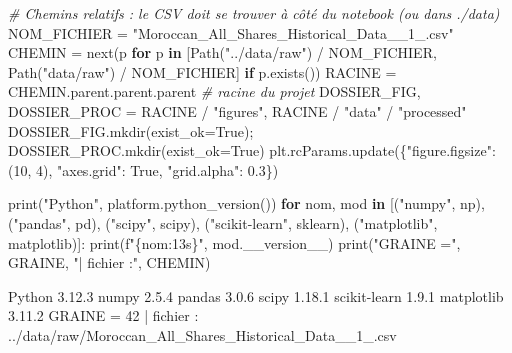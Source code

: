 \documentclass[
  10pt,
]{article}
\newenvironment{Shaded}{}{}
\newcommand{\BuiltInTok}[1]{\textcolor[rgb]{0.00,0.50,0.00}{#1}}
\newcommand{\CommentTok}[1]{\textcolor[rgb]{0.38,0.63,0.69}{\textit{#1}}}
\newcommand{\ControlFlowTok}[1]{\textcolor[rgb]{0.00,0.44,0.13}{\textbf{#1}}}
\newcommand{\DecValTok}[1]{\textcolor[rgb]{0.25,0.63,0.44}{#1}}
\newcommand{\FloatTok}[1]{\textcolor[rgb]{0.25,0.63,0.44}{#1}}
\newcommand{\KeywordTok}[1]{\textcolor[rgb]{0.00,0.44,0.13}{\textbf{#1}}}
\newcommand{\NormalTok}[1]{#1}
\newcommand{\OperatorTok}[1]{\textcolor[rgb]{0.40,0.40,0.40}{#1}}
\newcommand{\SpecialCharTok}[1]{\textcolor[rgb]{0.25,0.44,0.63}{#1}}
\newcommand{\SpecialStringTok}[1]{\textcolor[rgb]{0.73,0.40,0.53}{#1}}
\newcommand{\StringTok}[1]{\textcolor[rgb]{0.25,0.44,0.63}{#1}}
\newcommand{\VariableTok}[1]{\textcolor[rgb]{0.10,0.09,0.49}{#1}}
\begin{document}
\begin{Shaded}
\begin{Highlighting}[]
\CommentTok{\# Chemins relatifs : le CSV doit se trouver à côté du notebook (ou dans ./data)}
\NormalTok{NOM\_FICHIER }\OperatorTok{=} \StringTok{"Moroccan\_All\_Shares\_Historical\_Data\_\_1\_.csv"}
\NormalTok{CHEMIN }\OperatorTok{=} \BuiltInTok{next}\NormalTok{(p }\ControlFlowTok{for}\NormalTok{ p }\KeywordTok{in}\NormalTok{ [Path(}\StringTok{"../data/raw"}\NormalTok{) }\OperatorTok{/}\NormalTok{ NOM\_FICHIER, Path(}\StringTok{"data/raw"}\NormalTok{) }\OperatorTok{/}\NormalTok{ NOM\_FICHIER] }\ControlFlowTok{if}\NormalTok{ p.exists())}
\NormalTok{RACINE }\OperatorTok{=}\NormalTok{ CHEMIN.parent.parent.parent                  }\CommentTok{\# racine du projet}
\NormalTok{DOSSIER\_FIG, DOSSIER\_PROC }\OperatorTok{=}\NormalTok{ RACINE }\OperatorTok{/} \StringTok{"figures"}\NormalTok{, RACINE }\OperatorTok{/} \StringTok{"data"} \OperatorTok{/} \StringTok{"processed"}
\NormalTok{DOSSIER\_FIG.mkdir(exist\_ok}\OperatorTok{=}\VariableTok{True}\NormalTok{)}\OperatorTok{;}\NormalTok{ DOSSIER\_PROC.mkdir(exist\_ok}\OperatorTok{=}\VariableTok{True}\NormalTok{)}
\NormalTok{plt.rcParams.update(\{}\StringTok{"figure.figsize"}\NormalTok{: (}\DecValTok{10}\NormalTok{, }\DecValTok{4}\NormalTok{), }\StringTok{"axes.grid"}\NormalTok{: }\VariableTok{True}\NormalTok{, }\StringTok{"grid.alpha"}\NormalTok{: }\FloatTok{0.3}\NormalTok{\})}

\BuiltInTok{print}\NormalTok{(}\StringTok{"Python"}\NormalTok{, platform.python\_version())}
\ControlFlowTok{for}\NormalTok{ nom, mod }\KeywordTok{in}\NormalTok{ [(}\StringTok{"numpy"}\NormalTok{, np), (}\StringTok{"pandas"}\NormalTok{, pd), (}\StringTok{"scipy"}\NormalTok{, scipy), (}\StringTok{"scikit{-}learn"}\NormalTok{, sklearn), (}\StringTok{"matplotlib"}\NormalTok{, matplotlib)]:}
    \BuiltInTok{print}\NormalTok{(}\SpecialStringTok{f"}\SpecialCharTok{\{}\NormalTok{nom}\SpecialCharTok{:13s\}}\SpecialStringTok{"}\NormalTok{, mod.\_\_version\_\_)}
\BuiltInTok{print}\NormalTok{(}\StringTok{"GRAINE ="}\NormalTok{, GRAINE, }\StringTok{"| fichier :"}\NormalTok{, CHEMIN)}
\end{Highlighting}
\end{Shaded}

\begin{Shaded}
\begin{Highlighting}[]
\NormalTok{Python 3.12.3}
\NormalTok{numpy         2.5.4}
\NormalTok{pandas        3.0.6}
\NormalTok{scipy         1.18.1}
\NormalTok{scikit{-}learn  1.9.1}
\NormalTok{matplotlib    3.11.2}
\NormalTok{GRAINE = 42 | fichier : ../data/raw/Moroccan\_All\_Shares\_Historical\_Data\_\_1\_.csv}
\end{Highlighting}
\end{Shaded}
\end{document}
